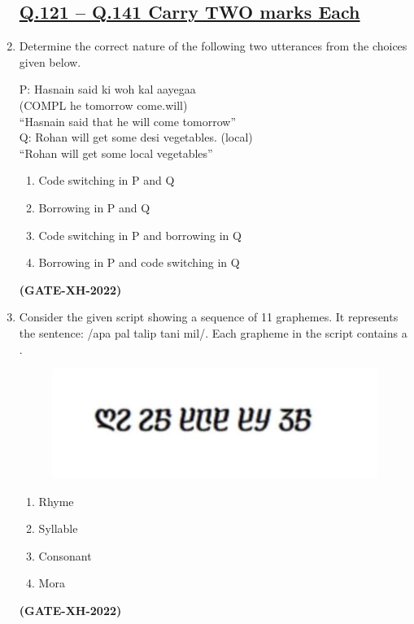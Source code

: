 \documentclass[journal]{IEEEtran}
\begin{document}
\begin{enumerate}
\subsection*{\underline{\textbf {Q.121 – Q.141 Carry TWO marks Each}}}

\item Determine the correct nature of the following two utterances from the choices given below.  

P: Hasnain said ki woh kal aayegaa \\
(COMPL he tomorrow come.will) \\
“Hasnain said that he will come tomorrow” \\

Q: Rohan will get some desi vegetables. (local) \\
“Rohan will get some local vegetables”  
\begin{enumerate}
\item Code switching in P and Q  
\item Borrowing in P and Q  
\item Code switching in P and borrowing in Q  
\item Borrowing in P and code switching in Q  
\end{enumerate}
\hfill\textbf{(GATE-XH-2022)}

\item Consider the given script showing a sequence of 11 graphemes. It represents the sentence: /apa pal talip tani mil/. Each grapheme in the script contains a \underline{\hspace{2cm}}.
\begin{figure}[h!]
    \centering
    \includegraphics[width=0.5\columnwidth]{figs/Q.122.jpeg}
    \label{Q.122}
\end{figure}
\begin{multicols}{4}
\begin{enumerate}
\item Rhyme  
\item Syllable  
\item Consonant  
\item Mora  
\end{enumerate}
\end{multicols}
\hfill\textbf{(GATE-XH-2022)}


\end{enumerate}
\end{document}
